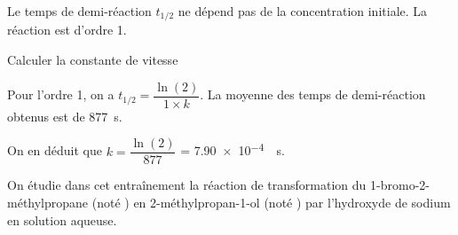 
\begin{corrige}
Le temps de demi-réaction $t_{1/2}$ ne dépend pas de la concentration initiale. La réaction est d'ordre 1. 
\end{corrige}



\begin{enonce}
Calculer la constante de vitesse
\end{enonce}


\begin{corrige}
Pour l'ordre 1, on a $t_{1/2} = \dfrac{\ln(2)}{1 \times k}$. La moyenne des temps de demi-réaction obtenus est de \SI{877}{\second}. 

On en déduit que $k = \dfrac{\ln(2)}{877}$ = \SI{7,90e-4}{\per\second}.
\end{corrige}


\finEntrainement




\newpage




\hauteurLargeurCadreReponse		{8mm}{3cm}
\initialisationEntrainement

On étudie dans cet entraînement la réaction de transformation du 1-bromo-2-méthylpropane (noté ) en 2-méthylpropan-1-ol (noté ) par l'hydroxyde de sodium en solution aqueuse. 


